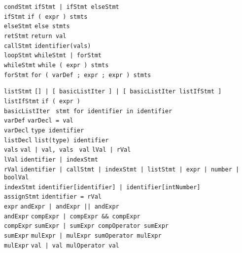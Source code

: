 \documentclass{article}
\newcommand{\keyword}[1]{\colorbox{light-gray}{\texttt{#1}}}
\newcommand{\code}[1]{\texttt{#1}}
\begin{document}
\code{condStmt} \textrightarrow \code{ifStmt | ifStmt elseStmt} \\
\code{ifStmt} \textrightarrow \code{\keyword{if (} expr \keyword{)} stmts } \\
\code{elseStmt} \textrightarrow \code{\keyword{else} stmts} \\
\code{retStmt} \textrightarrow \code{\keyword{return} val} \\
\code{callStmt} \textrightarrow \code{identifier\keyword{(}vals\keyword{)}} \\

\code{loopStmt} \textrightarrow \code{whileStmt | forStmt} \\
\code{whileStmt} \textrightarrow \code{\keyword{while (} expr \keyword{)} stmts} \\
\code{forStmt} \textrightarrow \code{\keyword{for (} varDef \keyword{;} expr \keyword{;} expr \keyword{)} stmts}

\code{listStmt} \textrightarrow \code{\keyword{[]} | \keyword{[} basicListIter \keyword{]} | \keyword{[} basicListIter listIfStmt \keyword{]} } \\
\code{listIfStmt} \textrightarrow \code{\keyword{if (} expr \keyword{)}} \\
\code{basicListIter} \textrightarrow \code{ stmt \keyword{for} identifier \keyword{in} identifier} \\

\code{varDef} \textrightarrow \code{varDecl \keyword{=} val} \\
\code{varDecl} \textrightarrow \code{type identifier} \\
\code{listDecl} \textrightarrow \code{\keyword{list(}type\keyword{)} identifier} \\
\code{vals} \textrightarrow \code{val | val, vals }
\code{val} \textrightarrow \code{lVal | rVal} \\
\code{lVal} \textrightarrow \code{identifier | indexStmt} \\
\code{rVal} \textrightarrow \code{identifier | callStmt | indexStmt | listStmt | expr | number | boolVal} \\
\code{indexStmt} \textrightarrow \code{identifier\keyword{[}identifier\keyword{]} | identifier\keyword{[}intNumber\keyword{]}} \\
\code{assignStmt} \textrightarrow \code{identifier \keyword{=} rVal} \\

\code{expr} \textrightarrow \code{andExpr | andExpr \keyword{||} andExpr} \\
\code{andExpr} \textrightarrow \code{compExpr | compExpr \keyword{\&\&} compExpr} \\
\code{compExpr} \textrightarrow \code{sumExpr | sumExpr compOperator sumExpr} \\
\code{sumExpr} \textrightarrow \code{mulExpr | mulExpr sumOperator mulExpr} \\
\code{mulExpr} \textrightarrow \code{val | val mulOperator val} \\
\end{document}
